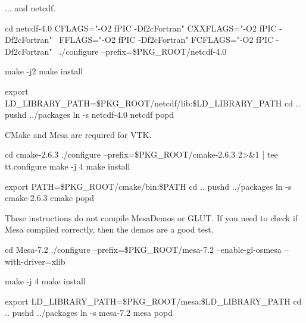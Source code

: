 ... and netcdf.
\begin{shellCode}
cd netcdf-4.0
CFLAGS="-O2 fPIC -Df2cFortran" CXXFLAGS="-O2 fPIC -Df2cFortran" \
FFLAGS="-O2 fPIC -Df2cFortran" FCFLAGS="-O2 fPIC -Df2cFortran" \
./configure --prefix=\$PKG_ROOT/netcdf-4.0

make -j2
make install

export LD_LIBRARY_PATH=\$PKG_ROOT/netcdf/lib:\$LD_LIBRARY_PATH
cd ..
pushd ../packages
ln -s netcdf-4.0 netcdf
popd
\end{shellCode}

CMake and Mesa are required for VTK. 
\begin{shellCode}
cd cmake-2.6.3
./configure --prefix=\$PKG_ROOT/cmake-2.6.3 2>&1 | tee tt.configure
make -j 4
make install

export PATH=\$PKG_ROOT/cmake/bin:\$PATH
cd ..
pushd ../packages
ln -s cmake-2.6.3 cmake
popd
\end{shellCode}

These instructions do not compile MesaDemos or GLUT.
If you need to check if Mesa compiled correctly, then the demos are a good test.
\begin{shellCode}
cd Mesa-7.2
./configure --prefix=\$PKG_ROOT/mesa-7.2 --enable-gl-osmesa --with-driver=xlib

make -j 4
make install

export LD_LIBRARY_PATH=\$PKG_ROOT/mesa:\$LD_LIBRARY_PATH
cd ..
pushd ../packages
ln -s mesa-7.2 mesa
popd
\end{shellCode}

